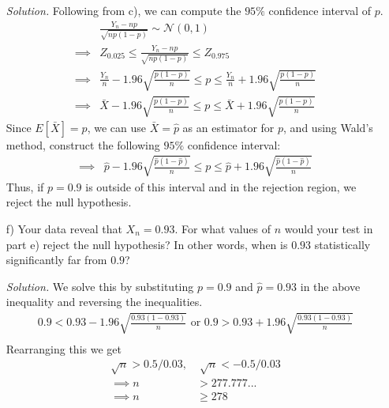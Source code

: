 \documentclass[
]{article}
\begin{document}
\begin{enumerate}
\textit{Solution.} Following from c), we can compute the $95\%$ confidence interval of $p$. \[\begin{aligned} 
&\frac{Y_n - np}{\sqrt{np(1-p)}} \sim \mathcal{N}(0,1) \\
\implies& Z_{0.025} \leq \frac{Y_n - np}{\sqrt{np(1-p)}} \leq Z_{0.975} \\
\implies& \frac{Y_n}{n} - 1.96\sqrt{\frac{p(1-p)}{n}} \leq p \leq  \frac{Y_n}{n} + 1.96\sqrt{\frac{p(1-p)}{n}} \\
\implies& \bar{X} - 1.96\sqrt{\frac{p(1-p)}{n}} \leq p \leq  \bar{X} + 1.96\sqrt{\frac{p(1-p)}{n}}
\end{aligned}\]
Since $E[\bar{X}] = p$, we can use $\bar{X} = \hat{p}$ as an estimator for $p$, and using Wald's method, construct the following $95\%$ confidence interval: 
\[\begin{aligned} 
\implies& \hat{p} - 1.96\sqrt{\frac{\hat{p}(1-\hat{p})}{n}} \leq p \leq \hat{p} + 1.96\sqrt{\frac{\hat{p}(1-\hat{p})}{n}}
\end{aligned}\]
Thus, if $p = 0.9$ is outside of this interval and in the rejection region, we reject the null hypothesis. 

\item[f)] Your data reveal that $X_n = 0.93$. For what values of $n$ would your test in part e) reject the null hypothesis? In other words, when is $0.93$ statistically significantly far from $0.9$?  
  
\textit{Solution.} 
We solve this by substituting $p = 0.9$ and $\hat{p} = 0.93$ in the above inequality and reversing the inequalities. 
\[\begin{aligned} 
0.9<0.93 - 1.96\sqrt{\frac{0.93(1-0.93)}{n}} \text{ or } 0.9 >  0.93 + 1.96\sqrt{\frac{0.93(1-0.93)}{n}} \\
\end{aligned}\]
Rearranging this we get 
\[\begin{aligned} 
\sqrt{n} > 0.5 / 0.03,& \;\sqrt{n} < - 0.5 / 0.03 \\
\implies n &> 277.777... \\
\implies n &\geq278
\end{aligned}\]

\end{enumerate}
\end{document}
